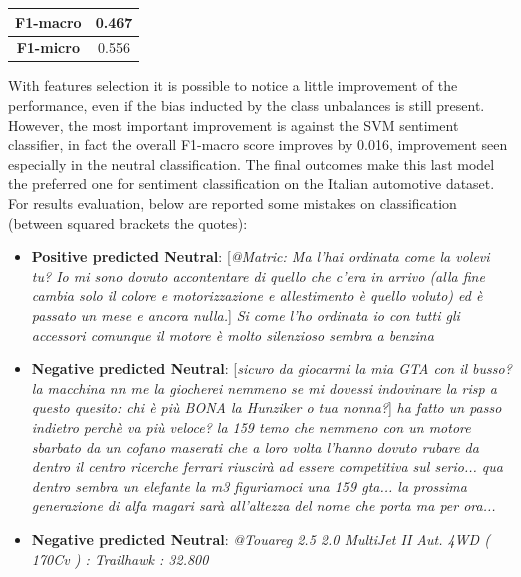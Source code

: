 \begin{center}
	\begin{tabular}{ | c | c | } 
		\hline
		\textbf{F1-macro} & 0.467 \\
		\hline
		\textbf{F1-micro} & 0.556 \\ 
		\hline
	\end{tabular}
\end{center}

With features selection it is possible to notice a little improvement of the performance, even if the bias inducted by the class unbalances is still present. However, the most important improvement is against the SVM sentiment classifier, in fact the overall F1-macro score improves by 0.016, improvement seen especially in the neutral classification. The final outcomes make this last model the preferred one for sentiment classification on the Italian automotive dataset.\\
For results evaluation, below are reported some mistakes on classification (between squared brackets the quotes):

\begin{itemize}
	\item \textbf{Positive predicted Neutral}: [\textit{@Matric: Ma l'hai ordinata come la volevi tu? Io mi sono dovuto accontentare di quello che c'era in arrivo (alla fine cambia solo il colore e motorizzazione e allestimento è quello voluto) ed è passato un mese e ancora nulla.}] \textit{Si come l'ho ordinata io con tutti gli accessori comunque il motore è molto silenzioso sembra a benzina}\\
	\item \textbf{Negative predicted Neutral}: [\textit{sicuro da giocarmi la mia GTA con il busso?la macchina nn me la giocherei nemmeno se mi dovessi indovinare la risp a questo quesito: chi è più BONA la Hunziker o tua nonna?}] \textit{ha fatto un passo indietro perchè va più veloce? la 159 temo che nemmeno con un motore sbarbato da un cofano maserati che a loro volta l'hanno dovuto rubare da dentro il centro ricerche ferrari riuscirà ad essere competitiva sul serio... qua dentro sembra un elefante la m3 figuriamoci una 159 gta... la prossima generazione di alfa magari sarà all'altezza del nome che porta ma per ora... } %
	\item \textbf{Negative predicted Neutral}: \textit{@Touareg 2.5 2.0 MultiJet II Aut. 4WD ( 170Cv ) : Trailhawk : 32.800}
\end{itemize}

